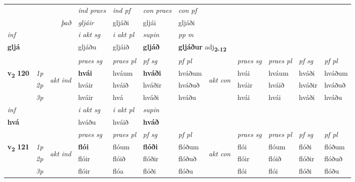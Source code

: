 \begin{longtable}[l]{X>{\footnotesize\itshape}llXXXXlXXXX}
   && &  \textit{ind praes} & \textit{ind pf} & \textit{con praes} & \textit{con pf} \\*
\multicolumn{3}{r}{\textit{það}} & gljáir & gljáði & gljái & gljáði \\*

\cmidrule{4-7}
   {\textit{inf}} & &  & \textit{i akt sg} & \textit{i akt pl}    & \textit{supin}  & \textit{pp m} \\*
  {\textbf{gljá}} & && gljáðu  & gljáið    &  \textbf{gljáð}  & \multicolumn{2}{l}{\textbf{gljáður} adj\textbf{\textsubscript{2-12}}} \\*

\midrule

 & &   & \textit{praes sg}  & \textit{praes pl}    & \textit{ pf sg} & \textit{pf pl} & & \textit{praes sg}  & \textit{praes pl}    & \textit{pf sg} & \textit{pf pl }  \\ \cmidrule{4-7} \cmidrule{9-12}
 \multirow{2}{*}{{{\textbf{v{\textsubscript{2}}} \Large{\textbf{120}}}}}  & 1p & \multirow{3}{*}{\begin{turn}{90}\textit{akt ind}\end{turn}} & \textbf{hvái} & hváum & \textbf{hváði} & hváðum & \multirow{3}{*}{\begin{turn}{90}\textit{akt con}\end{turn}} &hvái & hváum & hváði & hváðum\\*
 & 2p &  &  hváir  & hváið & hváðir & hváðuð & & hváir & hváið & hváðir & hváðuð \\*
 & 3p &  & hváir & hvá & hváði & hváðu & & hvái & hvái& hváði & hváðu \\*
\cmidrule{4-7} \cmidrule{9-12}

   {\textit{inf}} & &  & \textit{i akt sg} & \textit{i akt pl}    & \textit{supin}   \\*
  {\textbf{hvá}} & && hváðu  & hváið    &  \textbf{hváð}   \\*

\midrule

 & &   & \textit{praes sg}  & \textit{praes pl}    & \textit{ pf sg} & \textit{pf pl} & & \textit{praes sg}  & \textit{praes pl}    & \textit{pf sg} & \textit{pf pl }  \\ \cmidrule{4-7} \cmidrule{9-12}
 \multirow{2}{*}{{{\textbf{v{\textsubscript{2}}} \Large{\textbf{121}}}}}  & 1p & \multirow{3}{*}{\begin{turn}{90}\textit{akt ind}\end{turn}} & \textbf{flói} & flóum & \textbf{flóði} & flóðum & \multirow{3}{*}{\begin{turn}{90}\textit{akt con}\end{turn}} &flói & flóum & flóði & flóðum\\*
 & 2p &  &  flóir  & flóið & flóðir & flóðuð & & flóir & flóið & flóðir & flóðuð \\*
 & 3p &  & flóir & flóa & flóði & flóðu & & flói & flói& flóði & flóðu \\*
\cmidrule{4-7} \cmidrule{9-12}


\end{longtable}
